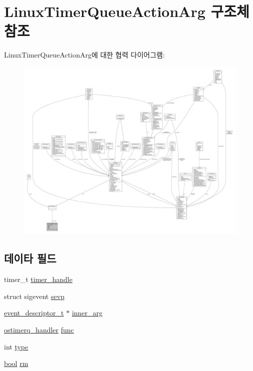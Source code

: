 \hypertarget{struct_linux_timer_queue_action_arg}{}\section{Linux\+Timer\+Queue\+Action\+Arg 구조체 참조}
\label{struct_linux_timer_queue_action_arg}


Linux\+Timer\+Queue\+Action\+Arg에 대한 협력 다이어그램\+:
\nopagebreak
\begin{figure}[H]
\begin{center}
\leavevmode
\includegraphics[width=350pt]{struct_linux_timer_queue_action_arg__coll__graph}
\end{center}
\end{figure}
\subsection*{데이타 필드}
\begin{DoxyCompactItemize}
\item 
timer\+\_\+t \hyperlink{struct_linux_timer_queue_action_arg_a1f6b0d9bef8b2411e159a7753850235d}{timer\+\_\+handle}
\item 
struct sigevent \hyperlink{struct_linux_timer_queue_action_arg_a9baffc52a0a03ab47948763b47ab6d91}{sevp}
\item 
\hyperlink{structevent__descriptor__t}{event\+\_\+descriptor\+\_\+t} $\ast$ \hyperlink{struct_linux_timer_queue_action_arg_afc701b8a5b43cd1d29422c68856bc614}{inner\+\_\+arg}
\item 
\hyperlink{avbts__ostimerq_8hpp_ac7e0bdbe70d3e2951c02906cf4ed3aed}{ostimerq\+\_\+handler} \hyperlink{struct_linux_timer_queue_action_arg_aaa1ebdc5351c8e4b6cd0b92aabfa4d52}{func}
\item 
int \hyperlink{struct_linux_timer_queue_action_arg_ac765329451135abec74c45e1897abf26}{type}
\item 
\hyperlink{avb__gptp_8h_af6a258d8f3ee5206d682d799316314b1}{bool} \hyperlink{struct_linux_timer_queue_action_arg_a059a8adfbb578bc50c97a96ae2ac0779}{rm}
\end{DoxyCompactItemize}


